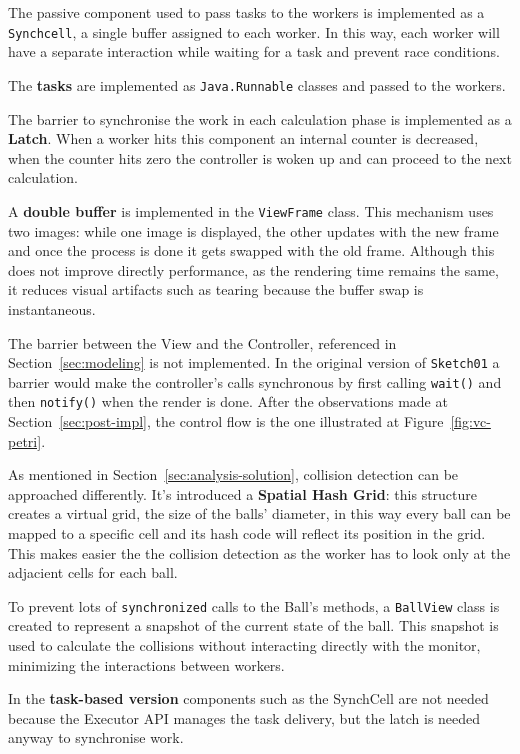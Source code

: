 \documentclass{scrartcl}
\begin{document}
The passive component used to pass tasks to the workers is implemented as a \texttt{Synchcell},
a single buffer assigned to each worker.
In this way, each worker will have a separate interaction while waiting for a task and prevent race
conditions.

The \textbf{tasks} are implemented as \texttt{Java.Runnable} classes and passed to
the workers.

The barrier to synchronise the work in each calculation phase is implemented as a \textbf{Latch}.
When a worker hits this component an internal counter is decreased, when the counter hits zero
the controller is woken up and can proceed to the next calculation.

A \textbf{double buffer} is implemented in the \texttt{ViewFrame} class.
This mechanism uses two images: while one image is displayed, 
the other updates with the new frame and once the process is done it gets
swapped with the old frame. 
Although this does not improve directly performance, as the rendering time remains the same,
it reduces visual artifacts such as tearing because the buffer swap is instantaneous.

The barrier between the View and the Controller, referenced in Section~\ref{sec:modeling}
is not implemented. In the original version of \texttt{Sketch01} a barrier would make 
the controller's calls synchronous by first
calling \texttt{wait()} and then \texttt{notify()} when the render is done. %
After the observations made at Section~\ref{sec:post-impl}, the control flow is the one
illustrated at Figure~\ref{fig:vc-petri}.

As mentioned in Section~\ref{sec:analysis-solution}, collision detection can be 
approached differently. It's introduced a \textbf{Spatial Hash Grid}: this structure creates
a virtual grid, the size of the balls' diameter, in this way every ball can be mapped
to a specific cell and its hash code will reflect its position in the grid.
This makes easier the the collision detection as the worker has to look only at 
the adjacient cells for each ball.  

To prevent lots of \texttt{synchronized} calls to the Ball's methods, a \texttt{BallView} class is
created to represent a snapshot of the current state of the ball. This snapshot is used to calculate
the collisions without interacting directly with the monitor, minimizing the interactions between workers.

In the \textbf{task-based version} components such as the SynchCell are not needed because the
Executor API manages the task delivery, but the latch is needed anyway to synchronise work.
\end{document}
